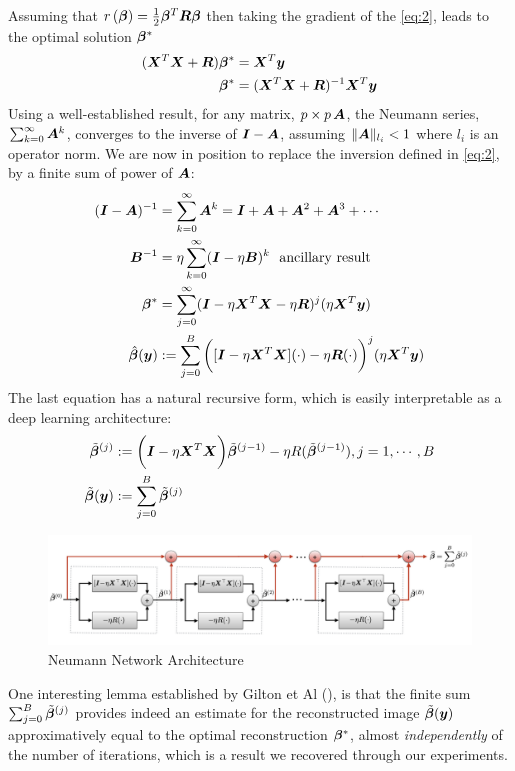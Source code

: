 \documentclass{article}
\begin{document}
Assuming that $r\left( \bm{\beta} \right) = \frac{1}{2} \bm{\beta}^T \bm{R} \bm{\beta}$ then taking the gradient of the \eqref{eq:2}, leads to the optimal solution $\bm{\beta}^{\ast}$
\begin{align*}
	(\bm{X}^T \bm{X} + \bm{R}) \bm{\beta}^* &=	\bm{X}^T \bm{y} \\
	\bm{\beta}^* 			&= (\bm{X}^T \bm{X} + \bm{R})^{-1} \bm{X}^T \bm{y} \\
\end{align*}
Using a well-established  result,  for any matrix, $ p \times p \, \bm{A}$, the Neumann series, $\sum_{k=0}^\infty \bm{A}^k$, converges to the inverse of $\bm{I} - \bm{A}$,
assuming $\|\bm{A}\|_{l_i} < 1$ where $l_i$ is an operator norm. We are now in position to replace the inversion defined in  \eqref{eq:2}, by a finite sum of power of $\bm{A}$:
\begin{align*}
	(\bm{I} - \bm{A})^{-1}	&= \sum_{k=0}^{\infty} \bm{A}^k = \bm{I} + \bm{A} + \bm{A}^2 + \bm{A}^3 + \cdots \\ 
	\bm{B}^{-1}			&= \eta  \sum_{k=0}^{\infty}  (\bm{I} - \eta \bm{B})^k \text{~ ancillary result} \\	
	\bm{\beta}^{\ast}		&=  \sum_{j=0}^{\infty} (\bm{I} - \eta \bm{X}^T \bm{X} -\eta \bm{R})^j (\eta \bm{X}^T \bm{y}) \\
	\hat{\bm{\beta}}(\bm{y})  &:=  \sum_{j=0}^{B} \bigg([ \bm{I} - \eta \bm{X}^T \bm{X} ](\cdot) -\eta \bm{R}(\cdot) \bigg)^j (\eta \bm{X}^T \bm{y}) \\	
\end{align*}
The last equation has a natural recursive form, which is easily interpretable as a deep learning architecture:
\begin{align*}
	\tilde{\bm{\beta}}^{(j)} 		&:=	\bigg( \bm{I} - \eta \bm{X}^T \bm{X} \bigg) \tilde{\bm{\beta}}^{(j-1)} - \eta R(\tilde{\bm{\beta}}^{(j-1)}), j=1, \cdots , B \\
	\tilde{\bm{\beta}}(\bm{y})	&:=   \sum_{j=0}^{B} \tilde{\bm{\beta}}^{(j)} \\
\end{align*}
	\begin{figure}[H]
		\centering
		\captionsetup{justification=centering}
		\includegraphics[width=400pt]{nn_architecture}
		\caption{Neumann Network Architecture}
		\label{fig:nn_architecture}
	\end{figure}
One interesting lemma established by Gilton et Al (\cite{DBLP:journals/corr/abs-1901-03707}), is that the finite sum $\sum_{j=0}^{B} \tilde{\bm{\beta}}^{(j)} $ provides indeed an estimate for the reconstructed image $\tilde{\bm{\beta}}(\bm{y})$  approximatively equal to the optimal reconstruction  $\bm{\beta}^{\ast}$, almost \emph{independently} of the number of iterations, which is a result we recovered through our experiments.
\end{document}
